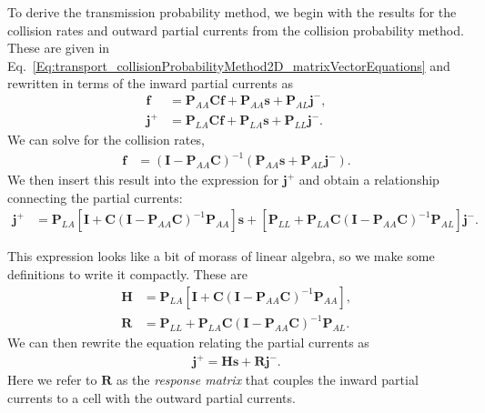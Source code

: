 To derive the transmission probability method, we begin with the results for the collision rates and outward partial currents from the collision probability method. These are given in Eq.~\eqref{Eq:transport_collisionProbabilityMethod2D_matrixVectorEquations} and rewritten in terms of the inward partial currents as
\begin{subequations}
\begin{align} 
  \mathbf{f}   &= \mathbf{P}_{AA} \mathbf{C} \mathbf{f} + \mathbf{P}_{AA} \mathbf{s} + \mathbf{P}_{AL} \mathbf{j}^- , \label{Eq:transport_transmissionProbability_cellCollisionRate} \\
  \mathbf{j}^+ &= \mathbf{P}_{LA} \mathbf{C} \mathbf{f} + \mathbf{P}_{LA} \mathbf{s} + \mathbf{P}_{LL} \mathbf{j}^- .
\end{align}
\end{subequations}
We can solve for the collision rates,
\begin{align}
  \mathbf{f} &= \left( \mathbf{I} - \mathbf{P}_{AA} \mathbf{C} \right)^{-1} \left( \mathbf{P}_{AA} \mathbf{s} + \mathbf{P}_{AL} \mathbf{j}^- \right) .
\end{align}
We then insert this result into the expression for $\mathbf{j}^+$ and obtain a relationship connecting the partial currents:
\begin{align}
  \mathbf{j}^+ 
  &= \mathbf{P}_{LA} \left[ \mathbf{I} + \mathbf{C} \left( \mathbf{I} - \mathbf{P}_{AA} \mathbf{C} \right)^{-1} \mathbf{P}_{AA} \right] \mathbf{s}
   + \left[ \mathbf{P}_{LL} + \mathbf{P}_{LA} \mathbf{C} \left( \mathbf{I} - \mathbf{P}_{AA} \mathbf{C} \right)^{-1} \mathbf{P}_{AL} \right] \mathbf{j}^- .
\end{align}

This expression looks like a bit of morass of linear algebra, so we make some definitions to write it compactly. These are
\begin{subequations}
\begin{align} 
  \mathbf{H}   &= \mathbf{P}_{LA} \left[ \mathbf{I} + \mathbf{C} \left( \mathbf{I} - \mathbf{P}_{AA} \mathbf{C} \right)^{-1} \mathbf{P}_{AA} \right] , \\
  \mathbf{R}   &= \mathbf{P}_{LL} + \mathbf{P}_{LA} \mathbf{C} \left( \mathbf{I} - \mathbf{P}_{AA} \mathbf{C} \right)^{-1} \mathbf{P}_{AL} .
\end{align}
\end{subequations}
We can then rewrite the equation relating the partial currents as
\begin{align}
  \mathbf{j}^+ = \mathbf{H} \mathbf{s} + \mathbf{R} \mathbf{j}^- .
\end{align}
Here we refer to $\mathbf{R}$ as the \emph{response matrix} that couples the inward partial currents to a cell with the outward partial currents.

